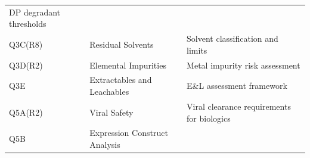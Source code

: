 \documentclass[
  11pt,
  a4paper,
]{report}
\begin{document}
\begin{longtable}[]{@{}lll@{}}
\begin{minipage}[t]{0.41\columnwidth}
DP degradant thresholds\strut
\end{minipage}\tabularnewline
\begin{minipage}[t]{0.30\columnwidth}\raggedright
Q3C(R8)\strut
\end{minipage} & \begin{minipage}[t]{0.19\columnwidth}\raggedright
Residual Solvents\strut
\end{minipage} & \begin{minipage}[t]{0.41\columnwidth}\raggedright
Solvent classification and limits\strut
\end{minipage}\tabularnewline
\begin{minipage}[t]{0.30\columnwidth}\raggedright
Q3D(R2)\strut
\end{minipage} & \begin{minipage}[t]{0.19\columnwidth}\raggedright
Elemental Impurities\strut
\end{minipage} & \begin{minipage}[t]{0.41\columnwidth}\raggedright
Metal impurity risk assessment\strut
\end{minipage}\tabularnewline
\begin{minipage}[t]{0.30\columnwidth}\raggedright
Q3E\strut
\end{minipage} & \begin{minipage}[t]{0.19\columnwidth}\raggedright
Extractables and Leachables\strut
\end{minipage} & \begin{minipage}[t]{0.41\columnwidth}\raggedright
E\&L assessment framework\strut
\end{minipage}\tabularnewline
\begin{minipage}[t]{0.30\columnwidth}\raggedright
Q5A(R2)\strut
\end{minipage} & \begin{minipage}[t]{0.19\columnwidth}\raggedright
Viral Safety\strut
\end{minipage} & \begin{minipage}[t]{0.41\columnwidth}\raggedright
Viral clearance requirements for biologics\strut
\end{minipage}\tabularnewline
\begin{minipage}[t]{0.30\columnwidth}\raggedright
Q5B\strut
\end{minipage} & \begin{minipage}[t]{0.19\columnwidth}\raggedright
Expression Construct Analysis\strut
\end{minipage} & \begin{minipage}[t]{0.41\columnwidth}\raggedright

\end{minipage}
\end{longtable}
\end{document}
